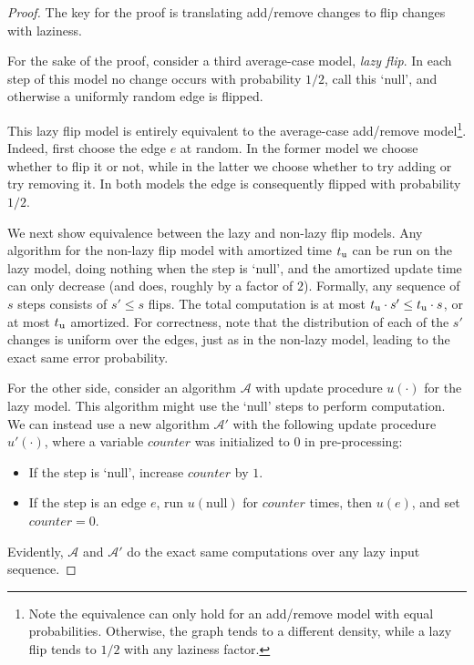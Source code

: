 \documentclass[letter,11pt]{article}
\newcommand{\tu}{t_{\textnormal{u}}}
\newcommand{\alg}[1]{{\mathcal{#1}}}
\begin{document}
\begin{proof}
	The key for the proof is translating add/remove changes to flip changes with laziness.
	
	For the sake of the proof, consider a third average-case model, \emph{lazy flip}.
	In each step of this model no change occurs with probability $1/2$, call this `null', 
    and otherwise a uniformly random edge is flipped.
    
 
    This lazy flip model is entirely equivalent to the average-case add/remove model\footnote{Note the equivalence can only hold for an add/remove model with equal probabilities. 
    Otherwise, the graph tends to a different density, while a lazy flip tends to $1/2$ with any laziness factor.}.
    Indeed, first choose the edge $e$ at random. 
    In the former model we choose whether to flip it or not, while in the latter we choose whether to try adding or try removing it. 
    In both models the edge is  consequently flipped with probability $1/2$.
	
	We next show equivalence between the lazy and non-lazy flip models.
	Any algorithm for the non-lazy flip model with amortized time $\tu$ can be run on the lazy model, doing nothing when the step is `null',
	and the amortized update time can only decrease (and does, roughly by a factor of $2$). 
	Formally, any sequence of $s$ steps consists of $s' \leq s$ flips. 
	The total computation is at most $\tu \cdot s' \leq \tu \cdot s$, or at most $\tu$ amortized.
	For correctness, note that the distribution of each of the $s'$ changes is uniform over the edges, just as in the non-lazy model, leading to the exact same error probability. 
	
	For the other side, consider an algorithm $\alg{A}$ with update procedure $u(\cdot)$ for the lazy model.
	This algorithm might use the `null' steps to perform computation.
	We can instead use a new algorithm $\alg{A'}$ with the following update procedure $u'(\cdot)$, where a variable $counter$ was initialized to $0$ in pre-processing:
	\begin{itemize}
		\item If the step is `null', increase $counter$ by $1$.
		
		\item If the step is an edge $e$, run $u(\text{null})$ for $counter$ times, then $u(e)$, and set $counter = 0$.
	\end{itemize}
	Evidently, $\alg{A}$ and $\alg{A'}$ do the exact same computations over any lazy input sequence.
	

\end{proof}
\end{document}

